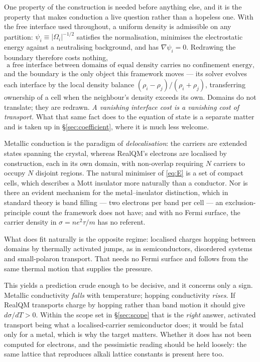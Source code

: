 \documentclass[11pt]{article}
\newcommand{\grad}{\nabla}
\begin{document}
One property of the construction is needed before anything else, and it is the property that makes
conduction a live question rather than a hopeless one. With the free interface used throughout, a
uniform density is admissible on any partition: $\psi_i\equiv|\Omega_i|^{-1/2}$ satisfies the
normalisation, minimises the electrostatic energy against a neutralising background, and has
$\grad\psi_i=0$. Redrawing the boundary therefore costs nothing,
\begin{equation}\label{eq:Czero}
\text{a free interface between domains of equal density carries no confinement energy,}
\end{equation}
and the boundary is the only object this framework moves --- its solver evolves each interface by the
local density balance $(\rho_i-\rho_j)/(\rho_i+\rho_j)$, transferring ownership of a cell when the
neighbour's density exceeds its own. Domains do not translate; they are redrawn. \emph{A vanishing
interface cost is a vanishing cost of transport.} What that same fact does to the equation of state
is a separate matter and is taken up in \S\ref{sec:coefficient}, where it is much less welcome.

Metallic conduction is the paradigm of \emph{delocalisation}: the carriers are extended states
spanning the crystal, whereas RealQM's electrons are localised by construction, each in its own
domain, with non-overlap requiring $N$ carriers to occupy $N$ disjoint regions. The natural minimiser
of \eqref{eq:E} is a set of compact cells, which describes a Mott insulator more naturally than a
conductor. Nor is there an evident mechanism for the metal--insulator distinction, which in standard
theory is band filling --- two electrons per band per cell --- an exclusion-principle count the
framework does not have; and with no Fermi surface, the carrier density in $\sigma=ne^2\tau/m$ has no
referent.

What does fit naturally is the opposite regime: localised charges hopping between domains by
thermally activated jumps, as in semiconductors, disordered systems and small-polaron transport. That
needs no Fermi surface and follows from the same thermal motion that supplies the pressure.

This yields a prediction crude enough to be decisive, and it concerns only a sign. Metallic
conductivity \emph{falls} with temperature; hopping conductivity \emph{rises}. If RealQM transports
charge by hopping rather than band motion it should give $d\sigma/dT>0$. Within the scope set in
\S\ref{sec:scope} that is the \emph{right} answer, activated transport being what a localised-carrier
semiconductor does; it would be fatal only for a metal, which is why the target matters. Whether it does has not been computed for electrons, and the
pessimistic reading should be held loosely: the same lattice that reproduces alkali lattice constants is
present here too.
\end{document}
